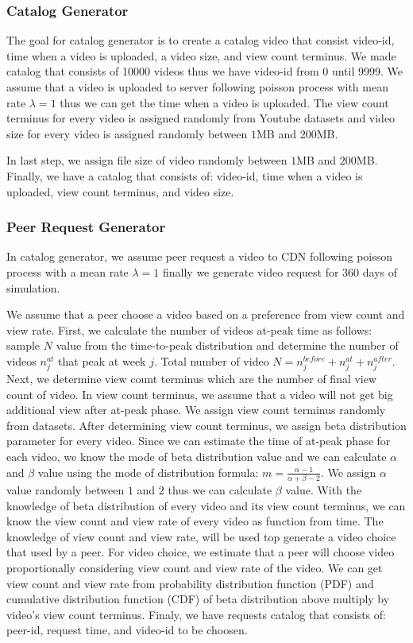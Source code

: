 \documentclass[10pt,final,journal,a4paper]{IEEEtran}
\begin{document}
\subsubsection{Catalog Generator}\label{catalog}
The goal for catalog generator is to create a catalog video that consist video-id, time when a video is uploaded, a video size, and view count terminus.
We made catalog that consists of 10000 videos thus we have video-id from 0 until 9999.
We assume that a video is uploaded to server following poisson process with mean rate $\lambda=1$ thus we can get the time when a video is uploaded. 
The view count terminus for every video is assigned randomly from Youtube datasets and video size for every video is assigned randomly between $1$MB and $200$MB. 

In last step, we assign file size of video randomly between $1$MB and $200$MB.
Finally, we have a catalog that consists of: video-id, time when a video is uploaded, view count terminus, and video size.



\subsubsection{Peer Request Generator}\label{peerrequest}
In catalog generator, we assume peer request a video to CDN following poisson process with a mean rate $\lambda=1$ \cite{Zink:2009:CYN:1502814.1502987} %
finally we generate video request for 360 days of simulation.

We assume that a peer choose a video based on a preference from view count and view rate.
First, we calculate the number of videos at-peak time as follows: sample $N$ value from the time-to-peak distribution and determine the number of videos $n_j^{at}$ that peak at week $j$. 
Total number of video $N = n_j^{before} + n_j^{at} + n_j^{after}$.\\
Next, we determine view count terminus which are the number of final view count of video.
In view count terminus, we assume that a video will not get big additional view after at-peak phase.
We assign view count terminus randomly from datasets.
After determining view count terminus, we assign beta distribution parameter for every video. 
Since we can estimate the time of at-peak phase for each video, we know the mode of beta distribution value and we can calculate $\alpha$ and $\beta$ value using the mode of distribution formula: $m=\frac{\alpha-1}{\alpha + \beta - 2}$.  
We assign $\alpha$ value randomly between $1$ and $2$ thus we can calculate $\beta$ value.
With the knowledge of beta distribution of every video and its view count terminus, we can know the view count and view rate of every video as function from time.
The knowledge of view count and view rate, will be used top generate a video choice that used by a peer.  
For video choice, we estimate that a peer will choose video proportionally considering view count and view rate of the video.   
We can get view count and view rate from probability distribution function (PDF) and cumulative distribution function (CDF) of beta distribution above multiply by video's view count terminus.
Finaly, we have requests catalog that consists of: peer-id, request time, and video-id to be choosen.
\end{document}

